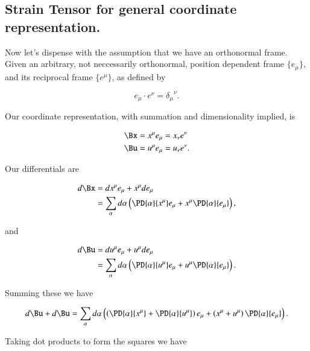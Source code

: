 \subsection{Strain Tensor for general coordinate representation.}

Now let's dispense with the assumption that we have an orthonormal frame.  Given an arbitrary, not neccessarily orthonormal, position dependent frame $\{e_\mu\}$, and its reciprocal frame $\{e^\mu\}$, as defined by

\begin{equation}\label{eqn:continuumL2:510}
e_\mu \cdot e^\nu = {\delta_\mu}^\nu.
\end{equation}

Our coordinate representation, with summation and dimensionality implied, is

\begin{align}\label{eqn:continuumL2:530}
\Bx &= x^\mu e_\mu = x_\nu e^\nu \\
\Bu &= u^\mu e_\mu = u_\nu e^\nu.
\end{align}

Our differentials are

\begin{equation}\label{eqn:continuumL2:550}
\begin{aligned}
d\Bx 
&= dx^\mu e_\mu + x^\mu d e_\mu \\
&= \sum_\alpha d\alpha \left( 
\PD{\alpha}{x^\mu} e_\mu
+
x^\mu
\PD{\alpha}{e_\mu} 
\right),
\end{aligned}
\end{equation}

and

\begin{equation}\label{eqn:continuumL2:570}
\begin{aligned}
d\Bu 
&= du^\mu e_\mu + u^\mu d e_\mu \\
&= 
\sum_\alpha
d\alpha \left( 
\PD{\alpha}{u^\mu} e_\mu
+
u^\mu
\PD{\alpha}{e_\mu} 
\right).
\end{aligned}
\end{equation}

Summing these we have

\begin{equation}\label{eqn:continuumL2:590}
d\Bu + d\Bu 
= 
\sum_\alpha
d\alpha \left( 
\left(
\PD{\alpha}{x^\mu} 
+
\PD{\alpha}{u^\mu} 
\right)
e_\mu
+
\left(
x^\mu
+
u^\mu
\right)
\PD{\alpha}{e_\mu} 
\right).
\end{equation}

Taking dot products to form the squares we have

